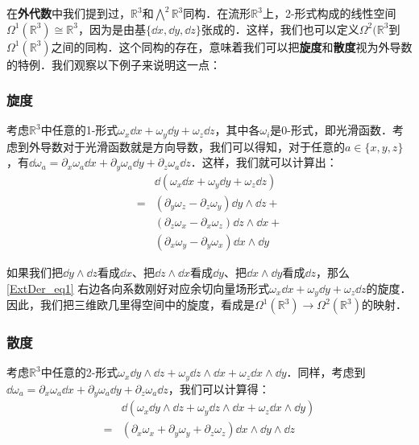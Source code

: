 在\textbf{外代数}中我们提到过，$\mathbb{R}^3$和$\bigwedge^2\mathbb{R}^3$同构．在流形$\mathbb{R}^3$上，2-形式构成的线性空间$\Omega^1(\mathbb{R}^3)\cong\mathbb{R}^3$，因为是由基$\{\dd x, \dd y, \dd z\}$张成的．这样，我们也可以定义$\Omega^2(\mathbb{R}^3$到$\Omega^1(\mathbb{R}^3)$之间的同构．这个同构的存在，意味着我们可以把\textbf{旋度}和\textbf{散度}视为外导数的特例．我们观察以下例子来说明这一点：

\subsubsection{旋度}

考虑$\mathbb{R}^3$中任意的1-形式$\omega_x\dd x+\omega_y\dd y+\omega_z\dd z$，其中各$\omega_i$是0-形式，即光滑函数．考虑到外导数对于光滑函数就是方向导数，我们可以得知，对于任意的$a\in\{x,y,z\}$，有$\dd\omega_a=\partial_x\omega_a\dd x+\partial_y\omega_a\dd y+\partial_z\omega_a\dd z$．这样，我们就可以计算出：
\begin{equation}\label{ExtDer_eq1}
\begin{aligned}
&\dd(\omega_x\dd x+\omega_y\dd y+\omega_z\dd z)\\=&(\partial_y\omega_z-\partial_z\omega_y)\dd y\wedge\dd z+\\&(\partial_z\omega_x-\partial_x\omega_z)\dd z\wedge\dd x+\\&(\partial_x\omega_y-\partial_y\omega_x)\dd x\wedge\dd y
\end{aligned}
\end{equation}

如果我们把$\dd y\wedge\dd z$看成$\dd x$、把$\dd z\wedge\dd x$看成$\dd y$、把$\dd x\wedge\dd y$看成$\dd z$，那么\autoref{ExtDer_eq1} 右边各向系数刚好对应余切向量场形式$\omega_x\dd x+\omega_y\dd y+\omega_z\dd z$的旋度．因此，我们把三维欧几里得空间中的旋度，看成是$\Omega^1(\mathbb{R}^3)\rightarrow\Omega^2(\mathbb{R}^3)$的映射．

\subsubsection{散度}

考虑$\mathbb{R}^3$中任意的2-形式$\omega_x\dd y\wedge\dd z+\omega_y\dd z\wedge\dd x+\omega_z\dd x\wedge\dd y$．同样，考虑到$\dd\omega_a=\partial_x\omega_a\dd x+\partial_y\omega_a\dd y+\partial_z\omega_a\dd z$，我们可以计算得：
\begin{equation}
\begin{aligned}
&\dd(\omega_x\dd y\wedge\dd z+\omega_y\dd z\wedge\dd x+\omega_z\dd x\wedge\dd y)\\=&(\partial_x\omega_x+\partial_y\omega_y+\partial_z\omega_z)\dd x\wedge\dd y\wedge\dd z
\end{aligned}
\end{equation}



